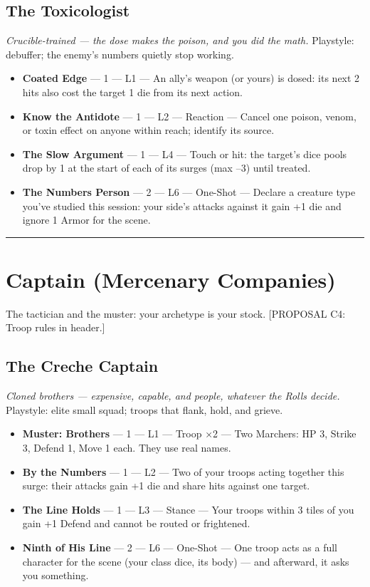 \subsection{The Toxicologist}
\textit{Crucible-trained --- the dose makes the poison, and you did the math.} Playstyle: debuffer; the enemy's numbers quietly stop working.
\begin{itemize}
    \item \textbf{Coated Edge} --- 1 --- L1 --- An ally's weapon (or yours) is dosed: its next 2 hits also cost the target 1 die from its next action.
    \item \textbf{Know the Antidote} --- 1 --- L2 --- Reaction --- Cancel one poison, venom, or toxin effect on anyone within reach; identify its source.
    \item \textbf{The Slow Argument} --- 1 --- L4 --- Touch or hit: the target's dice pools drop by 1 at the start of each of its surges (max --3) until treated.
    \item \textbf{The Numbers Person} --- 2 --- L6 --- One-Shot --- Declare a creature type you've studied this session: your side's attacks against it gain +1 die and ignore 1 Armor for the scene.
\end{itemize}

\medskip\hrule\medskip

\section{Captain \textnormal{(Mercenary Companies)}}

The tactician and the muster: your archetype is your stock. [PROPOSAL C4: Troop rules in header.]

\subsection{The Creche Captain}
\textit{Cloned brothers --- expensive, capable, and people, whatever the Rolls decide.} Playstyle: elite small squad; troops that flank, hold, and grieve.
\begin{itemize}
    \item \textbf{Muster: Brothers} --- 1 --- L1 --- Troop ×2 --- Two Marchers: HP 3, Strike 3, Defend 1, Move 1 each. They use real names.
    \item \textbf{By the Numbers} --- 1 --- L2 --- Two of your troops acting together this surge: their attacks gain +1 die and share hits against one target.
    \item \textbf{The Line Holds} --- 1 --- L3 --- Stance --- Your troops within 3 tiles of you gain +1 Defend and cannot be routed or frightened.
    \item \textbf{Ninth of His Line} --- 2 --- L6 --- One-Shot --- One troop acts as a full character for the scene (your class dice, its body) --- and afterward, it asks you something.
\end{itemize}

